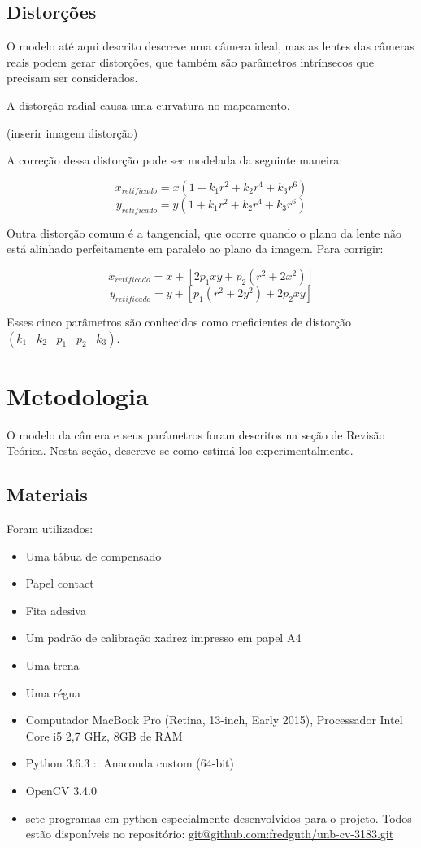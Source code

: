 \documentclass[conference]{IEEEtran}
\begin{document}
\subsection{Distorções}

O modelo até aqui descrito descreve uma câmera ideal, mas as lentes das câmeras reais podem gerar distorções, que também são parâmetros intrínsecos que precisam ser considerados. 

A distorção radial causa uma curvatura no mapeamento.

(inserir imagem distorção)

A correção dessa distorção pode ser modelada da seguinte maneira\cite{docsopencv}: 

    \[x_{retificado} = x( 1 + k_1 r^2 + k_2 r^4 + k_3 r^6)\]
    \[y_{retificado} = y( 1 + k_1 r^2 + k_2 r^4 + k_3 r^6)\]

Outra distorção comum é a tangencial, que ocorre quando o plano da lente não está alinhado perfeitamente em paralelo ao plano da imagem. Para corrigir:


\[x_{retificado} = x + [ 2p_1xy + p_2(r^2+2x^2)] \]
\[y_{retificado} = y + [ p_1(r^2+ 2y^2)+ 2p_2xy] \]


Esses cinco parâmetros são conhecidos como coeficientes de distorção
\((k_1 \hspace{10pt} k_2 \hspace{10pt} p_1 \hspace{10pt} p_2 \hspace{10pt} k_3)\).

\section{Metodologia}\label{metodologia}
O modelo da câmera e seus parâmetros foram descritos na seção de Revisão Teórica. Nesta seção, descreve-se como estimá-los experimentalmente.

\subsection{Materiais}
Foram utilizados:
\begin{itemize}
\item Uma tábua de compensado
\item Papel contact
\item Fita adesiva
\item Um padrão de calibração xadrez impresso em papel A4
\item Uma trena
\item Uma régua
\item Computador MacBook Pro (Retina, 13-inch, Early 2015), Processador Intel Core i5 2,7 GHz, 8GB de RAM
\item Python 3.6.3 :: Anaconda custom (64-bit)
\item OpenCV 3.4.0
\item sete programas em python especialmente desenvolvidos para o projeto. Todos estão disponíveis no repositório: \url{git@github.com:fredguth/unb-cv-3183.git}
\end{itemize}
\end{document}
